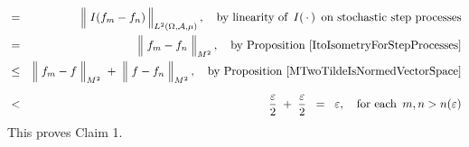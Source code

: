 \begin{enumerate}
\begin{eqnarray*}
	& = &
		\left\Vert\; I(f_{m} \overset{{\color{white}.}}{-} f_{n}) \,\right\Vert_{L^{2}(\Omega,\mathcal{A},\mu)},
		\quad
		\textnormal{by linearity of \,$I(\,\cdot\,)$\, on stochastic step processes}
	\\
	& = &
		\left\Vert\; f_{m} \overset{{\color{white}.}}{-} f_{n} \;\right\Vert_{M^{2}},
		\quad
		\textnormal{by Proposition \ref{ItoIsometryForStepProcesses}}
	\\
	& \leq &
		\left\Vert\; f_{m} \overset{{\color{white}.}}{-} f \;\right\Vert_{M^{2}}
		\; + \;
		\left\Vert\; f \overset{{\color{white}.}}{-} f_{n} \;\right\Vert_{M^{2}},
		\quad
		\textnormal{by Proposition \ref{MTwoTildeIsNormedVectorSpace}}
	\\
	& \overset{{\color{white}\textnormal{\Large$1$}}}{<} &
		\dfrac{\varepsilon}{2} \; + \; \dfrac{\varepsilon}{2}
	\;\; = \;\;
		\varepsilon,
	\quad
	\textnormal{for each \,$m, n > n(\varepsilon)$}
	\end{eqnarray*}
	This proves Claim 1.
	

\end{enumerate}
